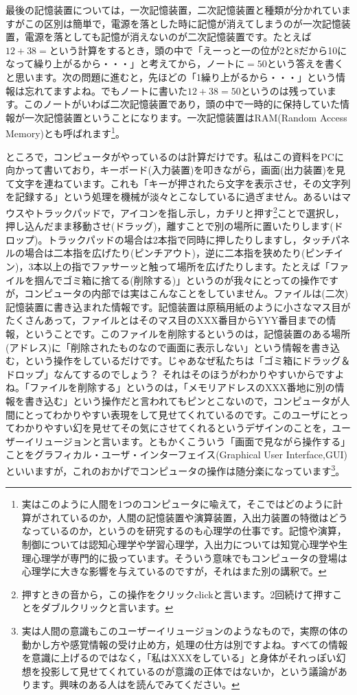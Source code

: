 \documentclass{ltjsbook}
\begin{document}
最後の記憶装置については，一次記憶装置，二次記憶装置と種類が分かれていますがこの区別は簡単で，電源を落とした時に記憶が消えてしまうのが一次記憶装置，電源を落としても記憶が消えないのが二次記憶装置です。たとえば$12+38=$という計算をするとき，頭の中で「えーっと一の位が2と8だから10になって繰り上がるから・・・」と考えてから，ノートに$=50$という答えを書くと思います。次の問題に進むと，先ほどの「1繰り上がるから・・・」という情報は忘れてますよね。でもノートに書いた$12+38=50$というのは残っています。このノートがいわば二次記憶装置であり，頭の中で一時的に保持していた情報が一次記憶装置ということになります。一次記憶装置はRAM(Random Access Memory)とも呼ばれます\footnote{実はこのように人間を1つのコンピュータに喩えて，そこではどのように計算がされているのか，人間の記憶装置や演算装置，入出力装置の特徴はどうなっているのか，というのを研究するのも心理学の仕事です。記憶や演算，制御については認知心理学や学習心理学，入出力については知覚心理学や生理心理学が専門的に扱っています。そういう意味でもコンピュータの登場は心理学に大きな影響を与えているのですが，それはまた別の講釈で。}。

ところで，コンピュータがやっているのは計算だけです。私はこの資料をPCに向かって書いており，キーボード(入力装置)を叩きながら，画面(出力装置)を見て文字を連ねています。これも「キーが押されたら文字を表示させ，その文字列を記録する」という処理を機械が淡々とこなしているに過ぎません。あるいはマウスやトラックパッドで，アイコンを指し示し，カチリと押す\footnote{押すときの音から，この操作をクリックclickと言います。2回続けて押すことをダブルクリックと言います。}ことで選択し，押し込んだまま移動させ(ドラッグ)，離すことで別の場所に置いたりします(ドロップ)。トラックパッドの場合は2本指で同時に押したりしますし，タッチパネルの場合は二本指を広げたり(ピンチアウト)，逆に二本指を狭めたり(ピンチイン)，3本以上の指でファサーッと触って場所を広げたりします。たとえば「ファイルを掴んでゴミ箱に捨てる(削除する)」というのが我々にとっての操作ですが，コンピュータの内部では実はこんなことをしていません。ファイルは(二次)記憶装置に書き込まれた情報です。記憶装置は原稿用紙のように小さなマス目がたくさんあって，ファイルとはそのマス目のXXX番目からYYY番目までの情報，ということです。このファイルを削除するというのは，記憶装置のある場所(アドレス)に「削除されたものなので画面に表示しない」という情報を書き込む，という操作をしているだけです。じゃあなぜ私たちは「ゴミ箱にドラッグ＆ドロップ」なんてするのでしょう？ それはそのほうがわかりやすいからですよね。「ファイルを削除する」というのは，「メモリアドレスのXXX番地に別の情報を書き込む」という操作だと言われてもピンとこないので，コンピュータが人間にとってわかりやすい表現をして見せてくれているのです。このユーザにとってわかりやすい幻を見せてその気にさせてくれるというデザインのことを，ユーザーイリュージョンと言います。ともかくこういう「画面で見ながら操作する」ことをグラフィカル・ユーザ・インターフェイス(Graphical User Interface,GUI)といいますが，これのおかげでコンピュータの操作は随分楽になっています\footnote{実は人間の意識もこのユーザーイリュージョンのようなもので，実際の体の動かし方や感覚情報の受け止め方，処理の仕方は別ですよね。すべての情報を意識に上げるのではなく，「私はXXXをしている」と身体がそれっぽい幻想を投影して見せてくれているのが意識の正体ではないか，という議論があります。興味のある人は\textcite{UserIlluision2002}を読んでみてください。}。
\end{document}
